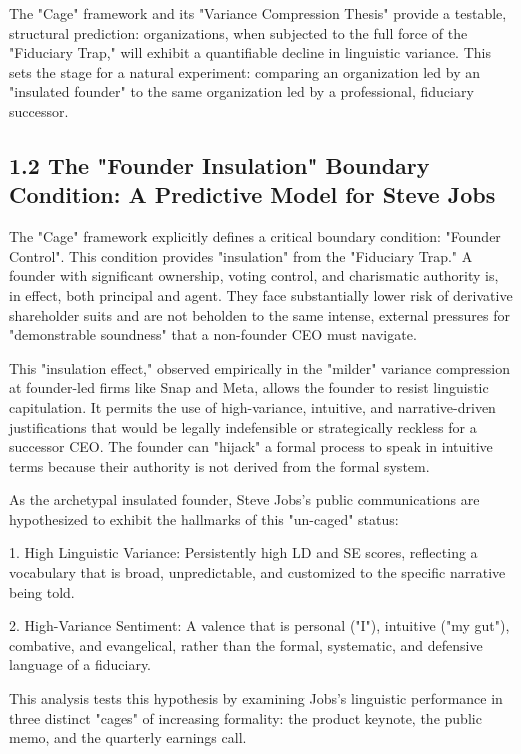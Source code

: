 \documentclass[12pt]{article}
\begin{document}
The "Cage" framework and its "Variance Compression Thesis" provide a testable, structural prediction: organizations, when subjected to the full force of the "Fiduciary Trap," will exhibit a quantifiable decline in linguistic variance. This sets the stage for a natural experiment: comparing an organization led by an "insulated founder" to the same organization led by a professional, fiduciary successor.

\subsection{1.2 The "Founder Insulation" Boundary Condition: A Predictive Model for Steve Jobs}

The "Cage" framework explicitly defines a critical boundary condition: "Founder Control". This condition provides "insulation" from the "Fiduciary Trap." A founder with significant ownership, voting control, and charismatic authority is, in effect, both principal and agent. They face substantially lower risk of derivative shareholder suits and are not beholden to the same intense, external pressures for "demonstrable soundness" that a non-founder CEO must navigate.

This "insulation effect," observed empirically in the "milder" variance compression at founder-led firms like Snap and Meta, allows the founder to resist linguistic capitulation. It permits the use of high-variance, intuitive, and narrative-driven justifications that would be legally indefensible or strategically reckless for a successor CEO. The founder can "hijack" a formal process to speak in intuitive terms because their authority is not derived from the formal system.

As the archetypal insulated founder, Steve Jobs's public communications are hypothesized to exhibit the hallmarks of this "un-caged" status:

1. High Linguistic Variance: Persistently high LD and SE scores, reflecting a vocabulary that is broad, unpredictable, and customized to the specific narrative being told.

2. High-Variance Sentiment: A valence that is personal ("I"), intuitive ("my gut"), combative, and evangelical, rather than the formal, systematic, and defensive language of a fiduciary.

This analysis tests this hypothesis by examining Jobs's linguistic performance in three distinct "cages" of increasing formality: the product keynote, the public memo, and the quarterly earnings call.
\end{document}
